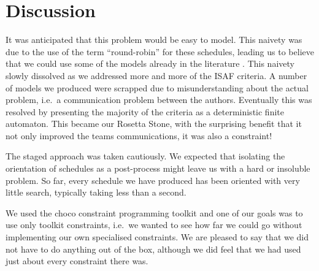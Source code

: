 \documentclass{llncs}
\begin{document}
\section{Discussion}

It was anticipated that this problem would be easy to model. This naivety was due to the use of the
term ``round-robin'' for these schedules, leading us to believe that we could use some of the models
already in the literature \cite{trick2002,trick2008,henz2004}. This naivety slowly dissolved as
we addressed more and more of the ISAF criteria. A number of models we produced were scrapped due to
misunderstanding about the actual problem, i.e.\ a communication problem between the authors.
Eventually this was resolved by presenting the majority of the criteria as a deterministic finite
automaton. This became our Rosetta Stone, with the surprising benefit that it not only improved the
teams communications, it was also a constraint!

The staged approach was taken cautiously. We expected that isolating the orientation of schedules as
a post-process might leave us with a hard or insoluble problem. So far, every schedule we have
produced has been oriented with very little search, typically taking less than a second.

We used the choco constraint programming toolkit and one of our goals was to use only toolkit
constraints, i.e.\ we wanted to see how far we could go without implementing our own specialised
constraints. We are pleased to say that we did not have to do anything out of the box, although we
did feel that we had used just about every constraint there was.
\end{document}

